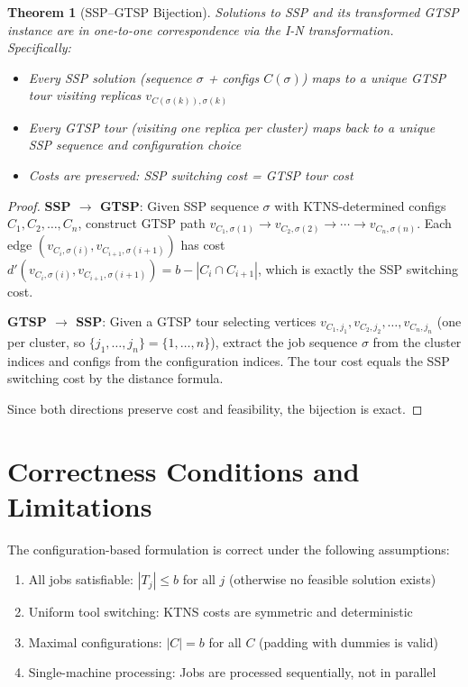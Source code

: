\documentclass[12pt]{article}
\newtheorem{theorem}{Theorem}[section]
\begin{document}
	\begin{theorem}[SSP--GTSP Bijection]
		\label{thm:bijection}
		Solutions to SSP and its transformed GTSP instance are in one-to-one correspondence via the I-N transformation. Specifically:
		\begin{itemize}
			\item Every SSP solution (sequence $\sigma$ + configs $C(\sigma)$) maps to a unique GTSP tour visiting replicas $v_{C(\sigma(k)), \sigma(k)}$
			\item Every GTSP tour (visiting one replica per cluster) maps back to a unique SSP sequence and configuration choice
			\item Costs are preserved: SSP switching cost = GTSP tour cost
		\end{itemize}
	\end{theorem}
	\begin{proof}
		\textbf{SSP $\to$ GTSP}: Given SSP sequence $\sigma$ with KTNS-determined configs $C_1, C_2, \ldots, C_n$, construct GTSP path $v_{C_1, \sigma(1)} \to v_{C_2, \sigma(2)} \to \cdots \to v_{C_n, \sigma(n)}$. Each edge $(v_{C_i, \sigma(i)}, v_{C_{i+1}, \sigma(i+1)})$ has cost $d'(v_{C_i, \sigma(i)}, v_{C_{i+1}, \sigma(i+1)}) = b - |C_i \cap C_{i+1}|$, which is exactly the SSP switching cost.
		
		\textbf{GTSP $\to$ SSP}: Given a GTSP tour selecting vertices $v_{C_1, j_1}, v_{C_2, j_2}, \ldots, v_{C_n, j_n}$ (one per cluster, so $\{j_1, \ldots, j_n\} = \{1, \ldots, n\}$), extract the job sequence $\sigma$ from the cluster indices and configs from the configuration indices. The tour cost equals the SSP switching cost by the distance formula.
		
		Since both directions preserve cost and feasibility, the bijection is exact.
	\end{proof}
	
	\section{Correctness Conditions and Limitations}
	
	The configuration-based formulation is correct under the following assumptions:
	\begin{enumerate}
		\item All jobs satisfiable: $|T_j| \le b$ for all $j$ (otherwise no feasible solution exists)
		\item Uniform tool switching: KTNS costs are symmetric and deterministic
		\item Maximal configurations: $|C| = b$ for all $C$ (padding with dummies is valid)
		\item Single-machine processing: Jobs are processed sequentially, not in parallel
	\end{enumerate}
	
\end{document}
